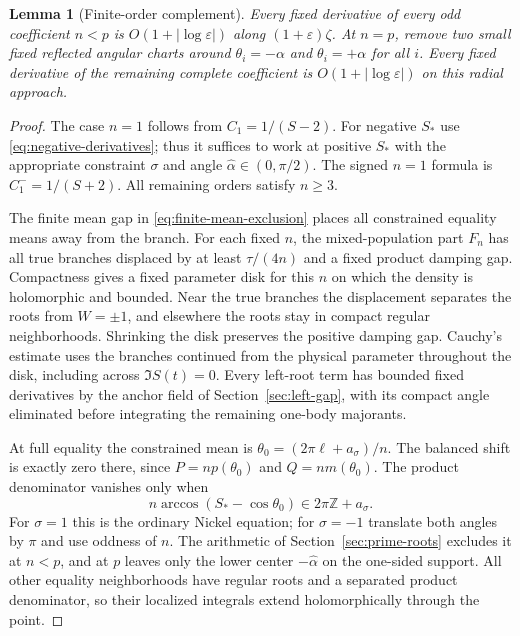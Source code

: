 \documentclass[11pt]{article}
\numberwithin{equation}{section}
\newtheorem{lemma}[theorem]{Lemma}
\theoremstyle{remark}\newtheorem{remark}[theorem]{Remark}
\begin{document}
\begin{lemma}[Finite-order complement]\label{lem:finite-complement}
Every fixed derivative of every odd coefficient $n<p$ is
$O(1+|\log\varepsilon|)$ along $(1+\varepsilon)\zeta$.
At $n=p$, remove two small fixed reflected angular charts around
$\theta_i=-\alpha$ and $\theta_i=+\alpha$ for all $i$.
Every fixed derivative of the remaining complete coefficient is
$O(1+|\log\varepsilon|)$ on this radial approach.
\end{lemma}
\begin{proof}
The case $n=1$ follows from $C_1=1/(S-2)$.
For negative $S_*$ use \eqref{eq:negative-derivatives}; thus
it suffices to work at positive $S_*$ with the appropriate
constraint $\sigma$ and angle $\widehat\alpha\in(0,\pi/2)$.
The signed $n=1$ formula is $C_1^-=1/(S+2)$.
All remaining orders satisfy $n\ge3$.

The finite mean gap in \eqref{eq:finite-mean-exclusion}
places all constrained equality means away from the branch.
For each fixed $n$, the mixed-population part $F_n$ has all true
branches displaced by at least $\tau/(4n)$ and a fixed product
damping gap. Compactness gives a fixed parameter disk for this $n$
on which the density is holomorphic and bounded. Near the true
branches the displacement separates the roots from $W=\pm1$, and
elsewhere the roots stay in compact regular neighborhoods.
Shrinking the disk preserves the positive damping gap. Cauchy's
estimate uses the branches continued from the physical parameter
throughout the disk, including across $\Im S(t)=0$.
Every left-root term has bounded fixed derivatives by the
anchor field of Section~\ref{sec:left-gap}, with its compact
angle eliminated before integrating the remaining one-body
majorants.

At full equality the constrained mean is
$\theta_0=(2\pi\ell+a_\sigma)/n$.
The balanced shift is exactly zero there, since
$P=np(\theta_0)$ and $Q=nm(\theta_0)$.
The product denominator vanishes only when
\[
 n\arccos(S_*-\cos\theta_0)\in2\pi\mathbb Z+a_\sigma.
\]
For $\sigma=1$ this is the ordinary Nickel equation; for
$\sigma=-1$ translate both angles by $\pi$ and use oddness of
$n$. The arithmetic of Section~\ref{sec:prime-roots} excludes
it at $n<p$, and at $p$ leaves only the lower center
$-\widehat\alpha$ on the one-sided support.
All other equality neighborhoods have regular roots and a
separated product denominator, so their localized integrals
extend holomorphically through the point.


\end{proof}
\end{document}
